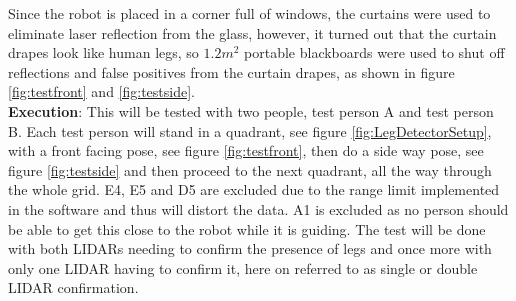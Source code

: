 Since the robot is placed in a corner full of windows, the curtains were used to eliminate laser reflection from the glass, however, it turned out that the curtain drapes look like human legs, so $1.2m^2$ portable blackboards were used to shut off reflections and false positives from the curtain drapes, as shown in figure \ref{fig:testfront} and \ref{fig:testside}.\\

\textbf{Execution}: This will be tested with two people, test person A and test person B. Each test person will stand in a quadrant, see figure \ref{fig:LegDetectorSetup}, with a front facing pose, see figure \ref{fig:testfront}, then do a side way pose, see figure \ref{fig:testside} and then proceed to the next quadrant, all the way through the whole grid. E4, E5 and D5 are excluded due to the range limit implemented in the software and thus will distort the data. A1 is excluded as no person should be able to get this close to the robot while it is guiding. The test will be done with both LIDARs needing to confirm the presence of legs and once more with only one LIDAR having to confirm it, here on referred to as single or double LIDAR confirmation.\\

